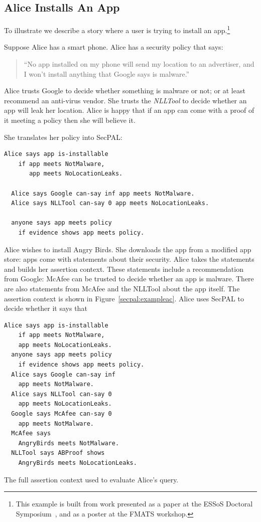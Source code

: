 \documentclass[a4paper]{article}
\begin{document}
\subsection{Alice Installs An App}

To illustrate we describe a story
where a user is trying to install an app.\footnote{This example is
built from work presented as a paper at the ESSoS Doctoral
Symposium~\cite{Hallett:2014un}, and as a poster at the FMATS workshop.}

Suppose Alice has a smart phone.  Alice has a security policy that says:
\begin{quote}
    ``No app installed on my phone will send my location to an advertiser, and I
      won't install anything that Google says is malware.''
\end{quote}
Alice trusts Google to decide whether something is malware or not; or at least
recommend an anti-virus vendor. She trusts the \emph{NLLTool} to decide whether
an app will leak her location.  Alice is happy that if an app can come with a
proof of it meeting a policy then she will believe it.

She translates her policy into SecPAL:

\begin{lstlisting}[language=SecPAL]
  Alice says app is-installable 
    if app meets NotMalware, 
       app meets NoLocationLeaks.

  Alice says Google can-say inf app meets NotMalware.
  Alice says NLLTool can-say 0 app meets NoLocationLeaks.

  anyone says app meets policy
    if evidence shows app meets policy.
\end{lstlisting}

Alice wishes to install Angry Birds. She downloads the app from a
modified app store: apps come with statements about their security.  Alice
takes the statements  and builds her assertion context.  These
statements include a recommendation from Google: McAfee can be trusted to
decide whether an app is malware. There are also statements from McAfee
and the NLLTool about the app itself. The assertion context is shown in
Figure~\ref{secpal:exampleac}.
Alice uses SecPAL to decide whether it says
that 

\begin{marginfigure}
\begin{lstlisting}[language=SecPAL]
  Alice says app is-installable 
    if app meets NotMalware, 
    app meets NoLocationLeaks.
  anyone says app meets policy 
    if evidence shows app meets policy.
  Alice says Google can-say inf 
    app meets NotMalware.
  Alice says NLLTool can-say 0 
    app meets NoLocationLeaks.
  Google says McAfee can-say 0 
    app meets NotMalware.
  McAfee says 
    AngryBirds meets NotMalware.
  NLLTool says ABProof shows 
    AngryBirds meets NoLocationLeaks.
\end{lstlisting}
\caption{The full assertion context used to evaluate Alice's query.}\label{secpal:exampleac}
\end{marginfigure}
\end{document}
